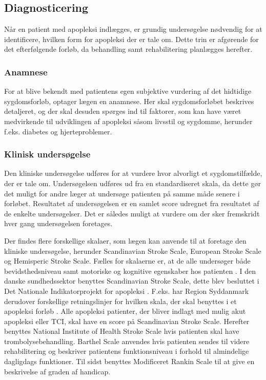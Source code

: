 \subsection{Diagnosticering}

Når en patient med apopleksi indlægges, er grundig undersøgelse nødvendig for at identificere, hvilken form for apopleksi der er tale om. Dette trin er afgørende for det efterfølgende forløb, da behandling samt rehabilitering planlægges herefter. \cite{Sundhedsstyrelsen2009}

\subsubsection{Anamnese}
For at blive bekendt med patientens egen subjektive vurdering af det hidtidige sygdomsforløb, optager lægen en anamnese. Her skal sygdomsforløbet  beskrives detaljeret, og der skal desuden spørges ind til faktorer, som kan have været medvirkende til udviklingen af apopleksi såsom livsstil og sygdomme, herunder f.eks. diabetes og hjerteproblemer. \cite{Sundhedsstyrelsen2009}

\subsubsection{Klinisk undersøgelse}
Den kliniske undersøgelse udføres for at vurdere hvor alvorligt et sygdomstilfælde, der er tale om. Undersøgelsen udføres ud fra en standardiseret skala, da dette gør det muligt for andre læger at undersøge patienten på samme måde senere i forløbet. Resultatet af undersøgelsen er en samlet score udregnet fra resultatet af de enkelte undersøgelser. Det er således muligt at vurdere om der sker fremskridt hver gang undersøgelsen foretages. \cite{Sundhedsstyrelsen2009}

Der findes flere forskellige skalaer, som lægen kan anvende til at foretage den kliniske undersøgelse, herunder Scandinavian Stroke Scale, European Stroke Scale og Hemisperic Stroke Scale. Fælles for skalaerne er, at de alle undersøger både bevidsthedsniveau samt motoriske og kognitive egenskaber hos patienten \cite{Center, Centera, Centerb, Centerc}. I den danske sundhedssektor benyttes Scandinavian Stroke Scale, dette blev besluttet i Det Nationale Indikatorprojekt for apopleksi \cite{Apopleksi2009}. F.eks. har Region Syddanmark derudover forskellige retningslinjer for hvilken skala, der skal benyttes i et apopleksi forløb \cite{Syddanmark}. Alle apopleksi patienter, der bliver indlagt med mulig akut apopleksi eller TCI, skal have en score på Scandinavian Stroke Scale. Herefter benyttes National Institute of Health Stroke Scale hvis patienten skal have trombolysebehandling. Barthel Scale anvendes hvis patienten sendes til videre rehabilitering og beskriver patientens funktionsniveau i forhold til almindelige dagligdags funktioner. Til sidst benyttes Modificeret Rankin Scale til at give en beskrivelse af graden af handicap. \cite{Syddanmark}

